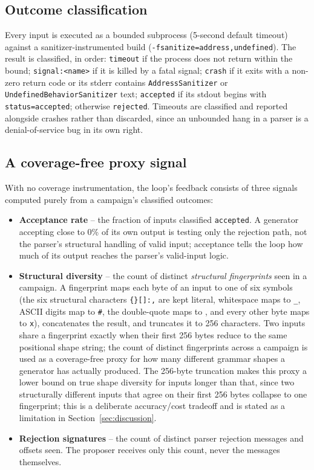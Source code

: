 \subsection{Outcome classification}
Every input is executed as a bounded subprocess (5-second default timeout)
against a sanitizer-instrumented build (\texttt{-fsanitize=address,undefined}).
The result is classified, in order: \texttt{timeout} if the process does not
return within the bound; \texttt{signal:<name>} if it is killed by a fatal
signal; \texttt{crash} if it exits with a non-zero return code or its
stderr contains \texttt{AddressSanitizer} or \texttt{UndefinedBehaviorSanitizer}
text; \texttt{accepted} if its stdout begins with \texttt{status=accepted};
otherwise \texttt{rejected}. Timeouts are classified and reported alongside
crashes rather than discarded, since an unbounded hang in a parser is a
denial-of-service bug in its own right.

\subsection{A coverage-free proxy signal}
\label{sec:proxy-signal}
With no coverage instrumentation, the loop's feedback consists of three signals
computed purely from a campaign's classified outcomes:

\begin{itemize}
  \item \textbf{Acceptance rate} -- the fraction of inputs classified
    \texttt{accepted}. A generator accepting close to 0\% of its own output
    is testing only the rejection path, not the parser's structural
    handling of valid input; acceptance tells the loop how much of its
    output reaches the parser's valid-input logic.
  \item \textbf{Structural diversity} -- the count of distinct
    \emph{structural fingerprints} seen in a campaign. A fingerprint maps
    each byte of an input to one of six symbols (the six structural
    characters \texttt{\{\}[]:,} are kept literal, whitespace maps to
    \texttt{\_}, ASCII digits map to \texttt{\#}, the double-quote maps to
    \texttt{\textquotedbl}, and every other byte maps to \texttt{x}), concatenates the
    result, and truncates it to 256 characters. Two inputs share a
    fingerprint exactly when their first 256 bytes reduce to the same
    positional shape string; the count of distinct fingerprints across a
    campaign is used as a coverage-free proxy for how many different
    grammar shapes a generator has actually produced. The 256-byte
    truncation makes this proxy a lower bound on true shape diversity for
    inputs longer than that, since two structurally different inputs that
    agree on their first 256 bytes collapse to one fingerprint; this is a
    deliberate accuracy/cost tradeoff and is stated as a limitation in
    Section~\ref{sec:discussion}.
  \item \textbf{Rejection signatures} -- the count of distinct parser
    rejection messages and offsets seen. The proposer receives only this
    count, never the messages themselves.
\end{itemize}

